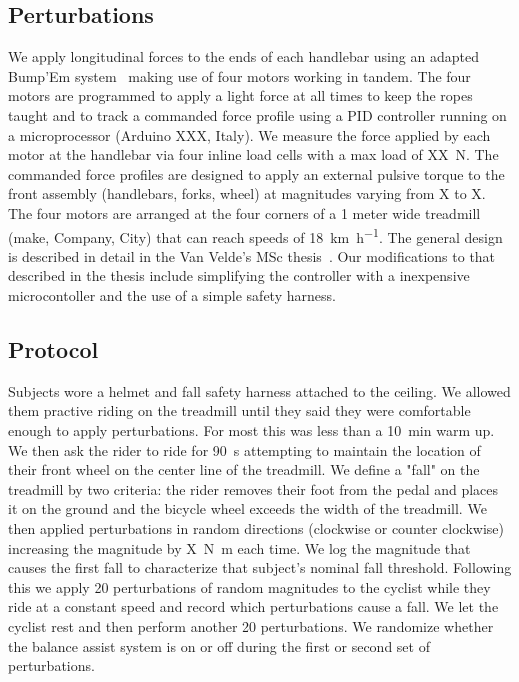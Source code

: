 \documentclass{article}
\begin{document}
\subsection{Perturbations}
%
We apply longitudinal forces to the ends of each handlebar using an adapted
Bump'Em system~\cite{todo} making use of four motors working in tandem. The
four motors are programmed to apply a light force at all times to keep the
ropes taught and to track a commanded force profile using a PID controller
running on a microprocessor (Arduino XXX, Italy). We measure the force applied
by each motor at the handlebar via four inline load cells with a max load of
XX~\si{\newton}. The commanded force profiles are designed to apply an external
pulsive torque to the front assembly (handlebars, forks, wheel) at magnitudes
varying from X to X. The four motors are arranged at the four corners of a 1
meter wide treadmill (make, Company, City) that can reach speeds of
18~\si{\kilo\meter\per\hour}. The general design is described in detail in the
Van Velde's MSc thesis~\cite{vanvelde2022}. Our modifications to that described
in the thesis include simplifying the controller with a inexpensive
microcontoller and the use of a simple safety harness.

\subsection{Protocol}
%
Subjects wore a helmet and fall safety harness attached to the ceiling. We
allowed them practive riding on the treadmill until they said they were
comfortable enough to apply perturbations. For most this was less than a
10~\si{\minute} warm up. We then ask the rider to ride for 90~\si{\second}
attempting to maintain the location of their front wheel on the center line of
the treadmill. We define a "fall" on the treadmill by two criteria: the rider
removes their foot from the pedal and places it on the ground and the bicycle
wheel exceeds the width of the treadmill. We then applied perturbations in
random directions (clockwise or counter clockwise) increasing the magnitude by
X~\si{\newton\meter} each time. We log the magnitude that causes the first fall
to characterize that subject's nominal fall threshold. Following this we apply
20 perturbations of random magnitudes to the cyclist while they ride at a
constant speed and record which perturbations cause a fall. We let the cyclist
rest and then perform another 20 perturbations. We randomize whether the
balance assist system is on or off during the first or second set of
perturbations.
\end{document}
